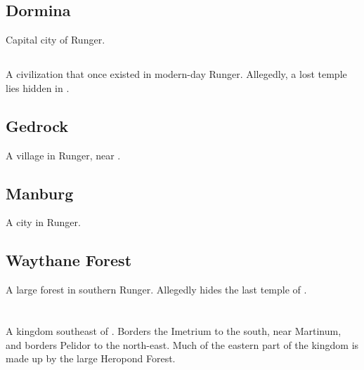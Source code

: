 \subsection{Dormina}
Capital city of Runger. 









\subsection{\EreshKal}
\index{\EreshKal}
A \meccaran{} civilization that once existed in modern-day Runger. 
Allegedly, a lost \EreshKali{} temple lies hidden in .  









\subsection{Gedrock}
A village in Runger, near . 









\subsection{Manburg}
A city in Runger. 









\subsection{Waythane Forest}
A large forest in southern Runger. Allegedly hides the last temple of . 















\section[Scyrum]{\Scyrum}
\index{\Scyrum}
A kingdom southeast of \Velcad{}. 
Borders the Imetrium to the south, near Martinum, and borders Pelidor to the north-east. 
Much of the eastern part of the kingdom is made up by the large Heropond Forest. 

